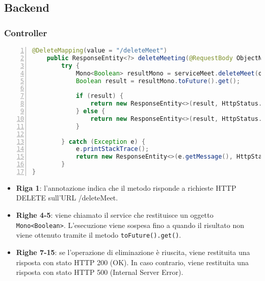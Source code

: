 \subsection{Backend}
\subsubsection{Controller}
\begin{lstlisting}[language=java, frame=lines, basicstyle=\ttfamily\scriptsize, numbers=left]
@DeleteMapping(value = "/deleteMeet")
    public ResponseEntity<?> deleteMeeting(@RequestBody ObjectNode obj) {
		try {
			Mono<Boolean> resultMono = serviceMeet.deleteMeet(obj);
			Boolean result = resultMono.toFuture().get();

			if (result) {
				return new ResponseEntity<>(result, HttpStatus.OK);
			} else {
				return new ResponseEntity<>(result, HttpStatus.INTERNAL_SERVER_ERROR);
			}

		} catch (Exception e) {
			e.printStackTrace();
			return new ResponseEntity<>(e.getMessage(), HttpStatus.INTERNAL_SERVER_ERROR);
		}
}
\end{lstlisting}
\begin{itemize}
    \item \textbf{Riga 1}: l’annotazione indica che il metodo risponde a richieste HTTP
    DELETE sull’URL /deleteMeet.

    \item \textbf{Righe 4-5}: viene chiamato il service che restituisce un oggetto \texttt{Mono<Boolean>}. 
    L'esecuzione viene sospesa fino a quando il risultato non viene ottenuto tramite il metodo \texttt{toFuture().get()}.

    \item \textbf{Righe 7-15}: se l'operazione di eliminazione è riuscita, viene restituita una risposta con stato HTTP 200 (OK). 
    In caso contrario, viene restituita una risposta con stato HTTP 500 (Internal Server Error).
\end{itemize}
